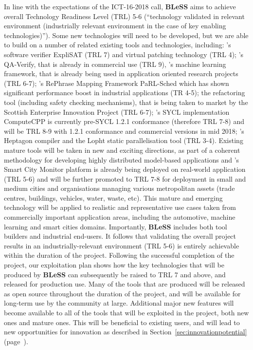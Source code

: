 \documentclass[a4paper,11pt]{article}
\newcommand{\project}[1]{\textbf{#1}\xspace}
\newcommand{\BLESS}{\project{BLeSS}}
\newcommand{\TheProject}{\BLESS}
\begin{document}
In line with the expectations of the ICT-16-2018 call, \TheProject{} aims
to achieve overall Technology Readiness Level (TRL) 5-6 (``technology
validated in relevant environment (industrially relevant environment in
the case of key enabling technologies)'').  Some new technologies will
need to be developed, but we are able to build on a number of related
existing tools and technologies, including: \IBM{}'s software verifier ExpliSAT (TRL 7) and virtual patching technology (TRL 4);
\PRL{}'s QA-Verify, that is already in
commercial use (TRL 9), 
\SCCH{}'s machine learning framework, that is
already being   used in application oriented research projects (TRL 6-7);
\SCCH{}'s RePhrase Mapping Framework PaRL-Sched which has shown significant performance boost in industrial applications (TR 4-5); the
\paraformance refactoring tool (including safety checking mechanisms), that is being taken to market by the
Scottish Enterprise \paraformance Innovation Project (TRL 6-7); \CODEPLAY{}'s SYCL implementation ComputeCPP is currently pre-SYCL 1.2.1 conformance (therefore TRL 7-8) and will be TRL 8-9 with 1.2.1 conformance and commercial versions in mid 2018; 
\INRIA{}'s Heptagon compiler and the Lopht static parallelisation tool (TRL 3-4).  Existing mature tools will be taken in
new and exciting directions, as part of a coherent methodology for
developing highly distributed model-based applications and 
\GOLEM{}’s Smart City Monitor platform is already being deployed on real-world application (TRL 5-6) and will be further promoted to TRL 7-8 for deployment in small and medium cities and organisations managing various metropolitan assets (trade centres, buildings, vehicles, water, waste, etc).
This mature and emerging technology will be applied to realistic and representative use cases
taken from commercially important application areas, including the automotive, machine learning and smart cities domains.
%
Importantly, \TheProject{} includes both tool builders and industrial
end-users.  It follows that validating the overall project results in an industrially-relevant environment (TRL 5-6)
is entirely achievable within the duration of the project. Following the successful completion 
of the project, our exploitation plan shows how the key technologies that will be produced
by \TheProject{} can subsequently be raised to TRL 7 and above, and released for production use.
Many of the tools that are produced will be released as open source throughout the duration of the project, and will be available
for long-term use by the community at large.
Additional major new features will become available to all of the tools that will be exploited in the project, both new ones and mature ones.
This will be beneficial to existing users, and will lead to new opportunities for innovation as described in Section~\ref{sec:innovationpotential} 
(page~\pageref{sec:innovationpotential}).
%
\end{document}
